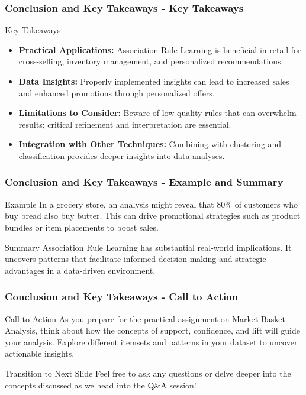 \documentclass[aspectratio=169]{beamer}
\begin{document}
\begin{frame}[fragile]
    \frametitle{Conclusion and Key Takeaways - Key Takeaways}
    \begin{block}{Key Takeaways}
        \begin{itemize}
            \item \textbf{Practical Applications:} 
            Association Rule Learning is beneficial in retail for cross-selling, inventory management, and personalized recommendations.
            
            \item \textbf{Data Insights:}
            Properly implemented insights can lead to increased sales and enhanced promotions through personalized offers.
            
            \item \textbf{Limitations to Consider:}
            Beware of low-quality rules that can overwhelm results; critical refinement and interpretation are essential.
            
            \item \textbf{Integration with Other Techniques:}
            Combining with clustering and classification provides deeper insights into data analyses.
        \end{itemize}
    \end{block}
\end{frame}

\begin{frame}[fragile]
    \frametitle{Conclusion and Key Takeaways - Example and Summary}
    \begin{block}{Example}
        In a grocery store, an analysis might reveal that 80\% of customers who buy bread also buy butter. 
        This can drive promotional strategies such as product bundles or item placements to boost sales.
    \end{block}

    \begin{block}{Summary}
        Association Rule Learning has substantial real-world implications. 
        It uncovers patterns that facilitate informed decision-making and strategic advantages in a data-driven environment. 
    \end{block}
\end{frame}

\begin{frame}[fragile]
    \frametitle{Conclusion and Key Takeaways - Call to Action}
    \begin{block}{Call to Action}
        As you prepare for the practical assignment on Market Basket Analysis, think about how the concepts of support, confidence, and lift will guide your analysis. 
        Explore different itemsets and patterns in your dataset to uncover actionable insights.
    \end{block}
    
    \begin{block}{Transition to Next Slide}
        Feel free to ask any questions or delve deeper into the concepts discussed as we head into the Q\&A session!
    \end{block}
\end{frame}
\end{document}
